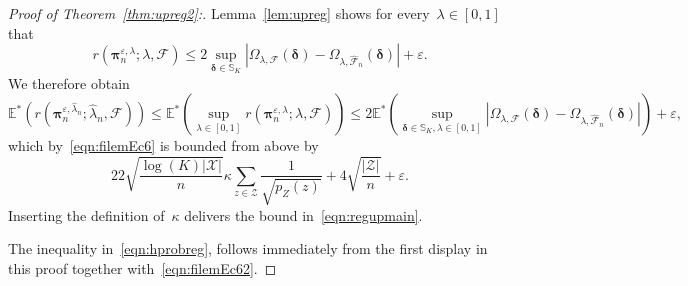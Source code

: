 \documentclass[11pt, a4paper]{article}
\theoremstyle{definition}
\begin{document}
%
\begin{proof}[Proof of Theorem~\ref{thm:upreg2}:]
Lemma~\ref{lem:upreg} shows for every~$\lambda \in [0, 1]$ that $$r(\bm{\pi}^{\varepsilon, \lambda}_n; \lambda, \mathcal{F})
\leq  2 \sup_{\bm{\delta} \in \mathbb{S}_K} |\Omega_{\lambda, \mathcal{F}}(\bm{\delta}) - \Omega_{\lambda, \hat{\mathcal{F}}_n}(\bm{\delta})| + \varepsilon.$$ We therefore obtain
%
\begin{equation*}
\mathbb{E}^*(r(\bm{\pi}^{\varepsilon,  \hat{\lambda}_n}_n;  \hat{\lambda}_n, \mathcal{F}) ) \leq \mathbb{E}^*\left(\sup_{\lambda \in [0, 1] } r\left(\bm{\pi}^{\varepsilon, \lambda}_n; \lambda, \mathcal{F}\right) \right) \leq 2 \mathbb{E}^*\left(  \sup_{\bm{\delta} \in \mathbb{S}_K, \lambda \in [0, 1]} |\Omega_{\lambda, \mathcal{F}}(\bm{\delta}) - \Omega_{\lambda, \hat{\mathcal{F}}_n}(\bm{\delta})| \right)   + \varepsilon,
\end{equation*}
%
which by~\eqref{eqn:filemEc6} is bounded from above by
%
\begin{equation}
22  \sqrt{ \frac{\log(K)|\mathcal{X}|}{n}} \kappa \sum_{z \in \mathcal{Z}} \frac{1}{\sqrt{p_{Z}(z)}} +  4 \sqrt{\frac{|\mathcal{Z}|}{n}} + \varepsilon.
\end{equation}
%
Inserting the definition of~$\kappa$ delivers the bound in~\eqref{eqn:regupmain}.

The inequality in~\eqref{eqn:hprobreg}, follows immediately from the first display in this proof together with~\eqref{eqn:filemEc62}.
\end{proof}
\end{document}
